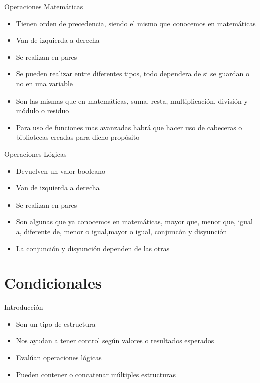 \documentclass{beamer}
\begin{document}
\begin{frame}{Operaciones Matem\'aticas}
    \begin{itemize}
        \item Tienen orden de precedencia, siendo el mismo que conocemos en matem\'aticas
        \item Van de izquierda a derecha
        \item Se realizan en pares
        \item Se pueden realizar entre diferentes tipos, todo dependera de si se guardan o no en una variable
        \item Son las mismas que en matem\'aticas, suma, resta, multiplicaci\'on, divisi\'on y m\'odulo o residuo
        \item Para uso de funciones mas avanzadas habrá que hacer uso de cabeceras o bibliotecas creadas para dicho prop\'osito
    \end{itemize}
\end{frame}

\begin{frame}{Operaciones L\'ogicas}
    \begin{itemize}
        \item Devuelven un valor booleano
        \item Van de izquierda a derecha
        \item Se realizan en pares
        \item Son algunas que ya conocemos en matem\'aticas, mayor que, menor que, igual a, diferente de, menor o igual,mayor o igual, conjunc\'on y disyunci\'on
        \item La conjunci\'on y disyunci\'on dependen de las otras
    \end{itemize}
\end{frame}

\section{Condicionales}

\begin{frame}{Introducci\'on}
    \begin{itemize}
        \item Son un tipo de estructura
        \item Nos ayudan a tener control seg\'un valores o resultados esperados
        \item Eval\'uan operaciones l\'ogicas
        \item Pueden contener o concatenar m\'ultiples estructuras
    \end{itemize}
\end{frame}
\end{document}
